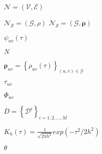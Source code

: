 \documentclass{article}
\begin{document}
	$\mathcal{N=(V,E)}$							%
	
	$\mathcal{N_S=(G,\rho)}$					%
	$\mathcal{N_S=(G,\bm{\rho})}$
	
	$\psi_{uv}(\tau)$							%
	
	$N$											%
	
	$\bm\rho_{uv}=\left\{ \rho_{uv}(\tau) \right\}_{(u,v)\in \mathcal{G}} $   %
	
	$\tau_{uv}$									%
	
	$\Phi_{uv}$									%
	
	$D=\left\{ \mathcal{D}^i\right\}_{i=1,2,...,M}$
	
	$K_h(\tau)=\frac{1}{\sqrt{2\pi h^2}}exp(-\tau^2/2h^2)$        
	
	$\theta$
\end{document}
